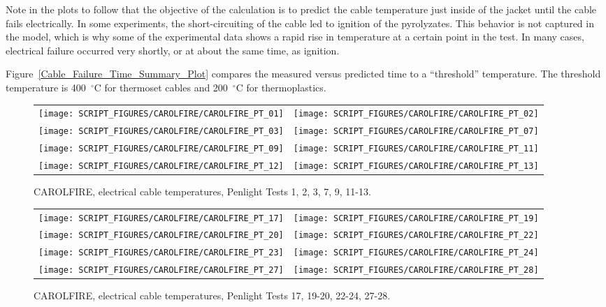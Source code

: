 Note in the plots to follow that the objective of the calculation is to predict the cable temperature just inside of the jacket until the cable fails electrically. In some experiments, the short-circuiting of the cable led to ignition of the pyrolyzates. This behavior is not captured in the model, which is why some of the experimental data shows a rapid rise in temperature at a certain point in the test. In many cases, electrical failure occurred very shortly, or at about the same time, as ignition.

Figure~\ref{Cable_Failure_Time_Summary_Plot} compares the measured versus predicted time to a ``threshold'' temperature. The threshold temperature is 400~$^\circ$C for thermoset cables and 200~$^\circ$C for thermoplastics.

\newpage

\begin{figure}[p]
\begin{tabular*}{\textwidth}{l@{\extracolsep{\fill}}r}
\texttt{[image: SCRIPT\_FIGURES/CAROLFIRE/CAROLFIRE\_PT\_01]} &
\texttt{[image: SCRIPT\_FIGURES/CAROLFIRE/CAROLFIRE\_PT\_02]} \\
\texttt{[image: SCRIPT\_FIGURES/CAROLFIRE/CAROLFIRE\_PT\_03]} &
\texttt{[image: SCRIPT\_FIGURES/CAROLFIRE/CAROLFIRE\_PT\_07]} \\
\texttt{[image: SCRIPT\_FIGURES/CAROLFIRE/CAROLFIRE\_PT\_09]} &
\texttt{[image: SCRIPT\_FIGURES/CAROLFIRE/CAROLFIRE\_PT\_11]} \\
\texttt{[image: SCRIPT\_FIGURES/CAROLFIRE/CAROLFIRE\_PT\_12]} &
\texttt{[image: SCRIPT\_FIGURES/CAROLFIRE/CAROLFIRE\_PT\_13]}
\end{tabular*}
\caption{CAROLFIRE, electrical cable temperatures, Penlight Tests 1, 2, 3, 7, 9, 11-13.}
\label{CAROLFIRE_Thermoset_1}
\end{figure}

\begin{figure}[p]
\begin{tabular*}{\textwidth}{l@{\extracolsep{\fill}}r}
\texttt{[image: SCRIPT\_FIGURES/CAROLFIRE/CAROLFIRE\_PT\_17]} &
\texttt{[image: SCRIPT\_FIGURES/CAROLFIRE/CAROLFIRE\_PT\_19]} \\
\texttt{[image: SCRIPT\_FIGURES/CAROLFIRE/CAROLFIRE\_PT\_20]} &
\texttt{[image: SCRIPT\_FIGURES/CAROLFIRE/CAROLFIRE\_PT\_22]} \\
\texttt{[image: SCRIPT\_FIGURES/CAROLFIRE/CAROLFIRE\_PT\_23]} &
\texttt{[image: SCRIPT\_FIGURES/CAROLFIRE/CAROLFIRE\_PT\_24]} \\
\texttt{[image: SCRIPT\_FIGURES/CAROLFIRE/CAROLFIRE\_PT\_27]} &
\texttt{[image: SCRIPT\_FIGURES/CAROLFIRE/CAROLFIRE\_PT\_28]}
\end{tabular*}
\caption{CAROLFIRE, electrical cable temperatures, Penlight Tests 17, 19-20, 22-24, 27-28.}
\label{CAROLFIRE_Thermoset_2}
\end{figure}

